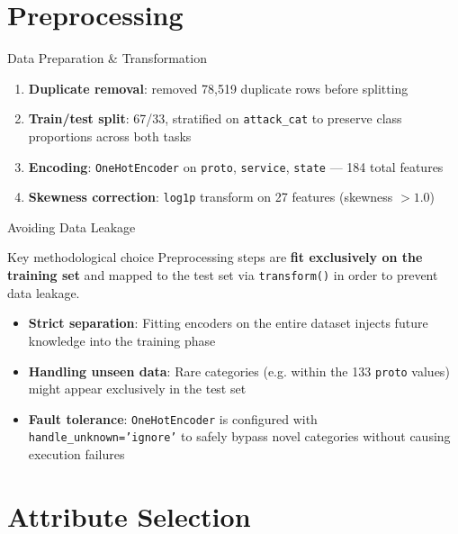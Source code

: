 \documentclass{beamer}
\begin{document}
\section{Preprocessing}

\begin{frame}{Data Preparation \& Transformation}
  \begin{enumerate}
    \item \textbf{Duplicate removal}: removed 78,519 duplicate rows before
      splitting
    \item \textbf{Train/test split}: 67/33, stratified on \texttt{attack\_cat} to preserve class proportions across both tasks
    \item \textbf{Encoding}: \texttt{OneHotEncoder} on \texttt{proto},
      \texttt{service}, \texttt{state} — 184 total features
    \item \textbf{Skewness correction}: \texttt{log1p} transform on 27
      features (skewness $> 1.0$)
  \end{enumerate}
\end{frame}

\begin{frame}{Avoiding Data Leakage}
  \begin{alertblock}{Key methodological choice}
    Preprocessing steps are \textbf{fit exclusively on the training set} and mapped to the test set via \texttt{transform()} in order to prevent data leakage.
  \end{alertblock}
  \vspace{0.3cm}
  \begin{itemize}
    \item \textbf{Strict separation}: Fitting encoders on the entire dataset injects future knowledge into the training phase
    \item \textbf{Handling unseen data}: Rare categories (e.g. within the 133 \texttt{proto} values) might appear exclusively in the test set
    \item \textbf{Fault tolerance}: \texttt{OneHotEncoder} is configured 
      with \texttt{handle\_unknown='ignore'} to safely bypass novel 
      categories without causing execution failures
  \end{itemize}
\end{frame}

\section{Attribute Selection}
\end{document}
